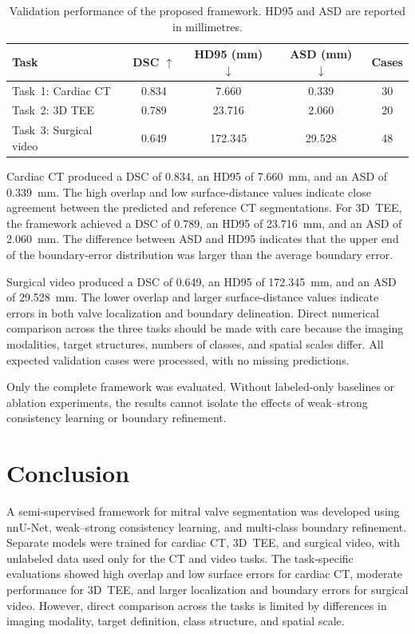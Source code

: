 \documentclass[runningheads]{llncs}
\begin{document}
\begin{table}[t]
\caption{Validation performance of the proposed framework. HD95 and
ASD are reported in millimetres.}
\label{tab:results}
\centering
\begin{tabular}{lcccc}
\toprule
Task & DSC $\uparrow$ & HD95 (mm) $\downarrow$ &
ASD (mm) $\downarrow$ & Cases \\
\midrule
Task~1: Cardiac CT      & 0.834 & 7.660   & 0.339  & 30 \\
Task~2: 3D TEE          & 0.789 & 23.716  & 2.060  & 20 \\
Task~3: Surgical video  & 0.649 & 172.345 & 29.528 & 48 \\
\bottomrule
\end{tabular}
\end{table}

Cardiac CT produced a DSC of 0.834, an HD95 of 7.660~mm, and an ASD
of 0.339~mm. The high overlap and low surface-distance values indicate
close agreement between the predicted and reference CT segmentations.
For 3D~TEE, the framework achieved a DSC of 0.789, an HD95 of
23.716~mm, and an ASD of 2.060~mm. The difference between ASD and
HD95 indicates that the upper end of the boundary-error distribution
was larger than the average boundary error.

Surgical video produced a DSC of 0.649, an HD95 of 172.345~mm, and an
ASD of 29.528~mm. The lower overlap and larger surface-distance values
indicate errors in both valve localization and boundary delineation.
Direct numerical comparison across the three tasks should be made with
care because the imaging modalities, target structures, numbers of
classes, and spatial scales differ. All expected validation cases were
processed, with no missing predictions.

Only the complete framework was evaluated. Without labeled-only
baselines or ablation experiments, the results cannot isolate the
effects of weak--strong consistency learning or boundary refinement.

\section{Conclusion}
\label{sec:conclusion}

A semi-supervised framework for mitral valve segmentation was developed
using nnU-Net, weak--strong consistency learning, and multi-class
boundary refinement. Separate models were trained for cardiac CT,
3D~TEE, and surgical video, with unlabeled data used only for the CT
and video tasks. The task-specific evaluations showed high overlap and
low surface errors for cardiac CT, moderate performance for 3D~TEE,
and larger localization and boundary errors for surgical video.
However, direct comparison across the tasks is limited by differences
in imaging modality, target definition, class structure, and spatial
scale.
\end{document}
